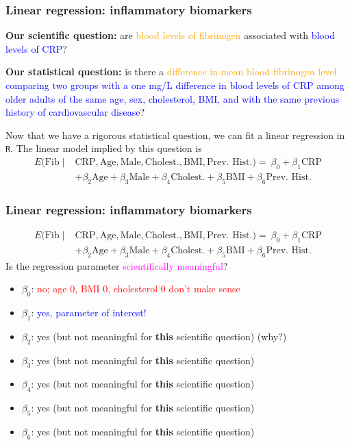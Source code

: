 \documentclass[12pt, 
hyperref={colorlinks=true, linkcolor=blue, urlcolor=cyan},dvipsnames]{beamer}
\begin{document}
\begin{frame}
\frametitle{Linear regression: inflammatory biomarkers}
\textbf{Our scientific question:} are \textcolor{orange}{blood levels of fibrinogen} associated with \textcolor{blue}{blood levels of CRP}?

\textbf{Our statistical question:} is there a \textcolor{orange}{difference in mean blood fibrinogen level} \textcolor{blue}{comparing two groups with a one mg/L difference in blood levels of CRP among older adults of the same age, sex, cholesterol, BMI, and with the same previous history of cardiovascular disease}?

Now that we have a rigorous statistical question, we can fit a linear regression in \texttt{R}. The linear model implied by this question is
\begin{align*}
E(\text{Fib} \mid & \text{CRP}, \text{Age}, \text{Male}, \text{Cholest.}, \text{BMI}, \text{Prev. Hist.}) =  \ \beta_0 + \beta_1 \text{CRP} \\
&+ \beta_2 \text{Age}  + \beta_3 \text{Male} + \beta_4 \text{Cholest.} + \beta_5 \text{BMI} + \beta_6 \text{Prev. Hist.}
\end{align*}
\end{frame}

\begin{frame}
\frametitle{Linear regression: inflammatory biomarkers}
{\small 
\begin{align*}
E(\text{Fib} \mid & \text{CRP}, \text{Age}, \text{Male}, \text{Cholest.}, \text{BMI}, \text{Prev. Hist.}) =  \ \beta_0 + \beta_1 \text{CRP} \\
&+ \beta_2 \text{Age}  + \beta_3 \text{Male} + \beta_4 \text{Cholest.} + \beta_5 \text{BMI} + \beta_6 \text{Prev. Hist.}
\end{align*}
}
Is the regression parameter \textcolor{magenta}{scientifically meaningful}? \vspace{-0.3cm}
\begin{itemize}
\item $\beta_0$: \pause \textcolor{red}{no; age 0, BMI 0, cholesterol 0 don't make sense}
\item $\beta_1$: \pause \textcolor{blue}{yes, parameter of interest!}
\item $\beta_2$: \pause yes (but not meaningful for \textbf{this} scientific question) (why?)
\item $\beta_3$: yes (but not meaningful for \textbf{this} scientific question)
\item $\beta_4$: yes (but not meaningful for \textbf{this} scientific question)
\item $\beta_5$: yes (but not meaningful for \textbf{this} scientific question)
\item $\beta_6$: yes (but not meaningful for \textbf{this} scientific question)
\end{itemize} 

\end{frame}
\end{document}
